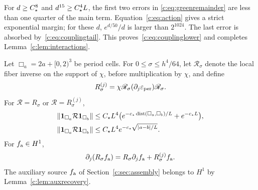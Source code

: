 For $d\ge C_\star^8$ and $d^{15}\ge C_\star^4L$, the first two errors in
\eqref{c:eq:greenremainder} are less than one quarter of the main term.
Equation~\eqref{c:eq:action} gives a strict exponential margin; for these
$d$, $e^{d/50}/d$ is larger than $2^{1024}$. The last error is absorbed
by~\eqref{c:eq:couplingtail}. This proves~\eqref{c:eq:couplinglower} and
completes Lemma~\ref{c:lem:interactions}.

\begin{lemma}
\label{c:lem:cellbounds}
Let $\Box_a=2a+[0,2)^3$ be period cells. For $0\le\sigma\le h^4/64$,
let $\mathscr R_\sigma$ denote the local fiber inverse on the support
of $\chi$, before multiplication by $\chi$, and define
\begin{equation}
 R_\sigma^{(j)}=
 \chi\mathscr R_\sigma(\partial_j\varepsilon_{\rm per})
       \mathscr R_\sigma.
                                                               \label{c:eq:Rderivative}
\end{equation}
For $\mathcal R=R_\sigma$ or $\mathcal R=R_\sigma^{(j)}$,
\begin{align}
 \left\lVert \mathbf 1_{\Box_a}\mathcal R\mathbf 1_{\Box_b}\right\rVert
 &\le C_\star L^4\big(e^{-c_\star\operatorname{dist}(\Box_a,\Box_b)/L}+e^{-c_\star L}\big),
                                                               \label{c:eq:cellspatial}\\
 \left\lVert \mathbf 1_{\Box_a}\mathcal R\mathbf 1_{\Box_b}\right\rVert
 &\le C_\star L^4 e^{-c_\star\sqrt{|a-b|/L}}.                 \label{c:eq:cellgevrey}
\end{align}
For $f_{\rm a}\in H^1$,
\begin{equation}
 \partial_j(R_\sigma f_{\rm a})=R_\sigma\partial_jf_{\rm a}+
                         R_\sigma^{(j)}f_{\rm a}.            \label{c:eq:derivativeidentity}
\end{equation}
The auxiliary source $f_{\rm a}$ of Section~\ref{c:sec:assembly} belongs to $H^1$
by Lemma~\ref{c:lem:auxrecovery}.
\end{lemma}
